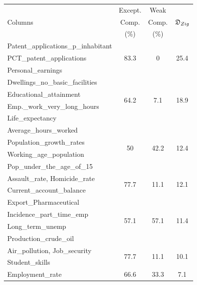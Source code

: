 \begin{table}[!t]
    \centering
    \small
    \begin{tabular}{p{4cm} c c c} 
        \hline
        \multirow{3}{*}{Columns}  & Except. & Weak  &
        \multirow{3}{*}{$\mathfrak{D}_{Zig}$}\\
                                  & Comp.   & Comp.& \\
                                  & (\%)    & (\%)& \\
        \hline
        Patent\_applications\_p\_inhabitant & \multirow{3}{*}{83.3}
        &\multirow{3}{*}{0} & \multirow{3}{*}{25.4} \\
        PCT\_patent\_applications&&&\\
        Personal\_earnings &&&\\
        \hline
        Dwellings\_no\_basic\_facilities&
        \multirow{4}{*}{64.2} &\multirow{4}{*}{7.1} & \multirow{4}{*}{18.9} \\
        Educational\_attainment&&&\\
        Emp.\_work\_very\_long\_hours&&&\\
        Life\_expectancy&&&\\
        \hline
        Average\_hours\_worked&
        \multirow{4}{*}{50} &\multirow{4}{*}{42.2} & \multirow{4}{*}{12.4} \\
        Population\_growth\_rates&&&\\ 
        Working\_age\_population&&&\\
        Pop\_under\_the\_age\_of\_15&&&\\
        \hline
        Assault\_rate, Homicide\_rate &
        \multirow{2}{*}{77.7} &\multirow{2}{*}{11.1} & \multirow{2}{*}{12.1} \\
        Current\_\-account\_balance&&&\\
        \hline
        Export\_Pharmaceutical&
        \multirow{4}{*}{57.1} &\multirow{4}{*}{57.1} & \multirow{4}{*}{11.4} \\
        Incidence\_part\_time\_emp&&&\\ 
        Long\_term\_unemp&&&\\ 
        Production\_crude\_oil&&&\\ 
        \hline
        Air\_pollution, Job\_security&
        \multirow{2}{*}{77.7} &\multirow{2}{*}{11.1} & \multirow{2}{*}{10.1} \\
        Student\_skills&&&\\
        \hline
        Employment\_rate&
        \multirow{3}{*}{66.6} &\multirow{3}{*}{33.3} & \multirow{3}{*}{7.1} \\

\end{tabular}
\end{table}
